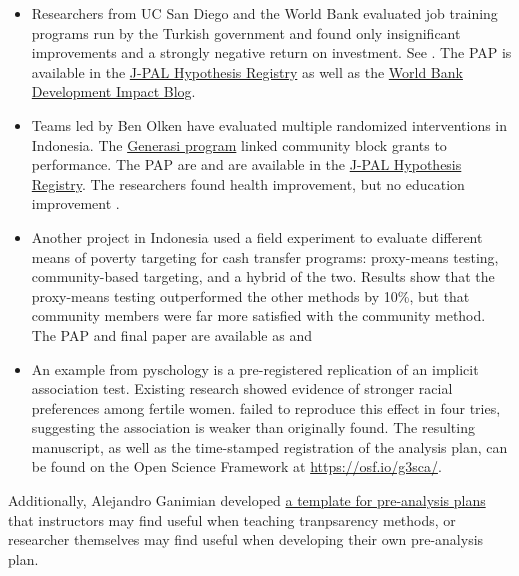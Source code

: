 \documentclass[12pt] {article}
\begin{document}
\begin{itemize}
\item
Researchers from UC San Diego and the World Bank evaluated job training programs run by the Turkish government and found only insignificant improvements and a strongly negative return on investment. See \cite{almeida_impact_2012, vocationalTurkey}. The PAP is available in the \href{http://www.povertyactionlab.org/Hypothesis-Registry}{J-PAL Hypothesis Registry} as well as the \href{http://blogs.worldbank.org/impactevaluations/files/impactevaluations/iskurie_analysisplan_v4a.pdf}{World Bank Development Impact Blog}.



\item 
Teams led by Ben Olken have evaluated multiple randomized interventions in Indonesia. The \href{http://www.povertyactionlab.org/evaluation/project-generasi-conditional-community-block-grants-indonesia}{Generasi program} linked community block grants to performance. The PAP are \cite{olken_generasi_2009, olken_generasi_2010} and are available in the \href{http://www.povertyactionlab.org/Hypothesis-Registry}{J-PAL Hypothesis Registry}. The researchers found health improvement, but no education improvement \citep{olken_indonesias_2010, olken_should_2014}.

\item 
Another project in Indonesia used a field experiment to evaluate different means of poverty targeting for cash transfer programs: proxy-means testing, community-based targeting, and a hybrid of the two. Results show that the proxy-means testing outperformed the other methods by 10\%, but that community members were far more satisfied with the community method. The PAP and final paper are available as \cite{olken_targeting_2009} and \cite{alatas_targeting_2012}

\item
An example from pyschology is a pre-registered replication of an implicit association test. Existing research showed evidence of stronger racial preferences among fertile women. \cite{NosekPreRegistered} failed to reproduce this effect in four tries, suggesting the association is weaker than originally found. The resulting manuscript, as well as the time-stamped registration of the analysis plan, can be found on the Open Science Framework at \url{https://osf.io/g3sca/}.
\end{itemize}
Additionally, Alejandro Ganimian developed \href{http://scholar.harvard.edu/files/alejandro_ganimian/files/pre-analysis_plan_template.pdf}{a template for pre-analysis plans} that instructors may find useful when teaching tranpsarency methods, or researcher themselves may find useful when developing their own pre-analysis plan.
\end{document}

